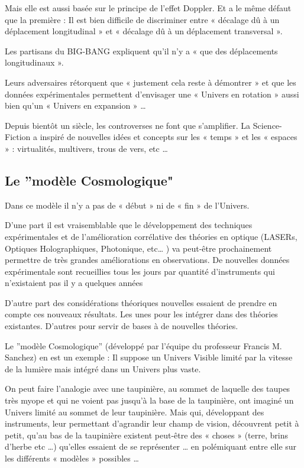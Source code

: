 \documentclass[a4paper,12pt]{article}
\begin{document}
Mais elle est aussi basée sur le principe de l'effet Doppler. Et a le même défaut que la première : Il est bien difficile de discriminer entre « décalage dû à un déplacement longitudinal » et « décalage dû à un déplacement transversal ».

Les partisans du BIG-BANG expliquent qu'il n'y a « que des déplacements longitudinaux ».

Leurs adversaires rétorquent que « justement cela reste à démontrer » et que les données expérimentales permettent d'envisager une « Univers en rotation » aussi bien qu'un « Univers en expansion » …

Depuis bientôt un siècle, les controverses ne font que s'amplifier. La Science-Fiction a inspiré de nouvelles idées et concepts sur les « temps » et les « espaces » : virtualités, multivers, trous de vers, etc …

\subsection{Le ”modèle Cosmologique"}
\label{sec:headings}

Dans ce modèle il n'y a pas de « début » ni de « fin » de l'Univers.

D'une part il est vraisemblable que le développement des techniques expérimentales et de l'amélioration corrélative des théories en optique (LASERs, Optiques Holographiques, Photonique, etc… ) va peut-être prochainement permettre de très grandes améliorations en observations. De nouvelles données expérimentale sont recueillies tous les jours par quantité d'instruments qui n'existaient pas il y a quelques années

D'autre part des considérations théoriques nouvelles essaient de prendre en compte ces nouveaux résultats. Les unes pour les intégrer dans des théories existantes. D'autres pour servir de bases à de nouvelles théories. 

Le ”modèle Cosmologique” (développé par l’équipe du professeur Francis M. Sanchez) en est un exemple : Il suppose un Univers Visible limité par la vitesse de la lumière mais intégré dans un Univers plus vaste. 

On peut faire l'analogie avec une taupinière, au sommet de laquelle des taupes très myope et qui ne voient pas jusqu'à la base de la taupinière, ont imaginé un Univers limité au sommet de leur taupinière. Mais qui, développant des instruments, leur permettant d'agrandir leur champ de vision, découvrent petit à petit, qu'au bas de la taupinière existent peut-être des « choses » (terre, brins d'herbe etc …) qu'elles essaient de se représenter … en polémiquant entre elle sur les différents « modèles » possibles …
\end{document}
